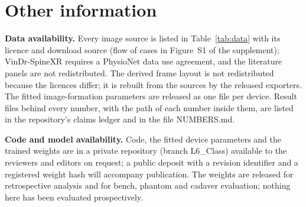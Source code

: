 \section*{Other information}
\textbf{Data availability.} Every image source is listed in Table~\ref{tab:data} with its licence and download source (flow of cases in Figure~S1 of the supplement); VinDr-SpineXR requires a PhysioNet data use agreement, and the literature panels are not redistributed. The derived frame layout is not redistributed because the licences differ; it is rebuilt from the sources by the released exporters. The fitted image-formation parameters are released as one file per device. Result files behind every number, with the path of each number inside them, are listed in the repository's claims ledger and in the file NUMBERS.md.

\textbf{Code and model availability.} Code, the fitted device parameters and the trained weights are in a private repository (branch L6\_Class) available to the reviewers and editors on request; a public deposit with a revision identifier and a registered weight hash will accompany publication. The weights are released for retrospective analysis and for bench, phantom and cadaver evaluation; nothing here has been evaluated prospectively.

